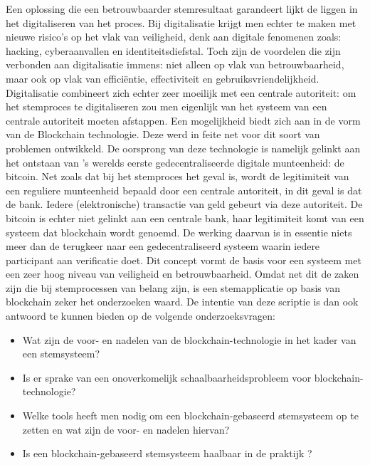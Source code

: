 Een oplossing die een betrouwbaarder stemresultaat  garandeert lijkt de liggen in het digitaliseren van het proces. Bij digitalisatie krijgt men echter te maken met nieuwe risico's op het vlak van veiligheid, denk aan digitale fenomenen zoals: hacking, cyberaanvallen en identiteitsdiefstal. Toch zijn de voordelen die zijn verbonden aan digitalisatie immens: niet alleen op vlak van betrouwbaarheid, maar ook op vlak van efficiëntie, effectiviteit en gebruiksvriendelijkheid. Digitalisatie combineert zich echter zeer moeilijk met een centrale autoriteit: om het stemproces te digitaliseren zou men eigenlijk van het systeem van een centrale autoriteit moeten afstappen. 
Een mogelijkheid biedt zich aan in de vorm van de Blockchain technologie. Deze werd in feite net voor dit soort van problemen ontwikkeld. De oorsprong van deze technologie is namelijk gelinkt aan het ontstaan van 's werelds eerste gedecentraliseerde digitale munteenheid: de bitcoin. 
Net zoals dat bij het stemproces het geval is, wordt de legitimiteit van een reguliere munteenheid bepaald door een centrale autoriteit, in dit geval is dat de bank. Iedere (elektronische) transactie van geld gebeurt via deze autoriteit. De bitcoin is echter niet gelinkt aan een centrale bank, haar legitimiteit komt van een systeem dat blockchain wordt genoemd. De werking daarvan is in essentie niets meer dan de terugkeer naar een gedecentraliseerd systeem waarin iedere participant aan verificatie doet. 
Dit concept vormt de basis voor een systeem met een zeer hoog niveau van veiligheid en betrouwbaarheid. Omdat net dit de zaken zijn die bij stemprocessen van belang zijn, is een stemapplicatie op basis van blockchain zeker het onderzoeken waard.  De intentie van deze scriptie is dan ook antwoord te kunnen bieden op de volgende onderzoeksvragen:
\begin{itemize}
  \item Wat zijn de voor- en nadelen van de blockchain-technologie in het kader van een stemsysteem?
  \item Is er sprake van een onoverkomelijk schaalbaarheidsprobleem voor blockchain-technologie?
  \item Welke tools heeft men nodig om een blockchain-gebaseerd stemsysteem op te zetten en wat zijn de voor- en nadelen hiervan?
  \item Is een blockchain-gebaseerd stemsysteem haalbaar in de praktijk ?
\end{itemize}


